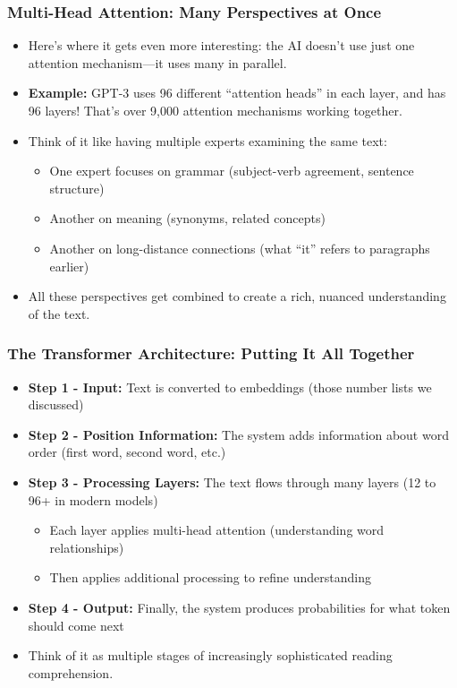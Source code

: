 \documentclass{beamer}
\begin{document}
\begin{frame}
    \frametitle{Multi-Head Attention: Many Perspectives at Once}
    \begin{itemize}
        \item Here's where it gets even more interesting: the AI doesn't use just one attention mechanism—it uses many in parallel.
    \item \textbf{Example:} GPT-3 uses 96 different ``attention heads'' in each layer, and has 96 layers! That's over 9,000 attention mechanisms working together.
        \item Think of it like having multiple experts examining the same text:
        \begin{itemize}
            \item One expert focuses on grammar (subject-verb agreement, sentence structure)
            \item Another on meaning (synonyms, related concepts)
            \item Another on long-distance connections (what ``it'' refers to paragraphs earlier)
        \end{itemize}
        \item All these perspectives get combined to create a rich, nuanced understanding of the text.
    \end{itemize}
\end{frame}

\begin{frame}
    \frametitle{The Transformer Architecture: Putting It All Together}
    \begin{itemize}
        \item \textbf{Step 1 - Input:} Text is converted to embeddings (those number lists we discussed)
        \item \textbf{Step 2 - Position Information:} The system adds information about word order (first word, second word, etc.)
        \item \textbf{Step 3 - Processing Layers:} The text flows through many layers (12 to 96+ in modern models)
        \begin{itemize}
            \item Each layer applies multi-head attention (understanding word relationships)
            \item Then applies additional processing to refine understanding
        \end{itemize}
        \item \textbf{Step 4 - Output:} Finally, the system produces probabilities for what token should come next
        \item Think of it as multiple stages of increasingly sophisticated reading comprehension.
    \end{itemize}
\end{frame}
\end{document}
